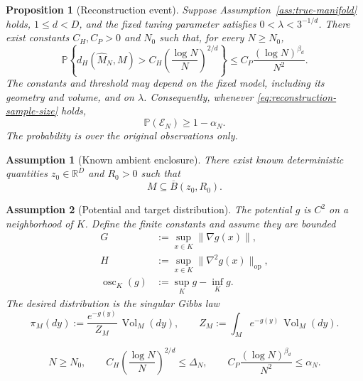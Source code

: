 \documentclass[10pt,a4paper]{amsart}
\newtheorem{assumption}{Assumption}
\newtheorem{proposition}{Proposition}
\newcommand{\Pp}{\mathbb P}
\newcommand{\R}{\mathbb R}
\newcommand{\Vol}{\operatorname{Vol}}
\newcommand{\cE}{\mathcal E}
\newcommand{\osc}{\operatorname{osc}}
\newcommand{\wideM}{\widehat M_N}
\begin{document}
\begin{proposition}[Reconstruction event]
\label{prop:reconstruction-event}
Suppose Assumption~\ref{ass:true-manifold} holds, $1\le d<D$, and the
fixed tuning parameter satisfies $0<\lambda<3^{-1/d}$. There exist
constants $C_H,C_P>0$ and $N_0$ such that, for every $N\ge N_0$,
\begin{equation}
 \Pp\left\{
 d_H(\wideM,M)>
 C_H\left(\frac{\log N}{N}\right)^{2/d}
 \right\}
 \le C_P\frac{(\log N)^{\beta_d}}{N^2}.
\label{eq:divol-reconstruction-tail}
\end{equation}
The constants and threshold may depend on the fixed model, including its
geometry and volume, and on $\lambda$. Consequently, whenever
\eqref{eq:reconstruction-sample-size} holds,
\begin{equation}
  \Pp(\cE_N)\ge1-\alpha_N.
\label{eq:event-probability}
\end{equation}
The probability is over the original observations only.
\end{proposition}

\begin{assumption}[Known ambient enclosure]
\label{ass:ambient-envelope}
There exist known deterministic quantities $z_0\in\R^D$ and $R_0>0$
such that
\[
    M\subseteq \overline B(z_0,R_0).
\]
\end{assumption}

\begin{assumption}[Potential and target distribution]
\label{ass:potential-target}
The potential $g$ is $C^2$ on a neighborhood of $K$. Define the finite
constants and assume they are bounded
\begin{align}
 G&:=\sup_{x\in K}\lVert\nabla g(x)\rVert,\label{eq:G-def}\\
 H&:=\sup_{x\in K}\lVert\nabla^2g(x)\rVert_{\mathrm{op}},\label{eq:H-def}\\
 \osc_K(g)&:=\sup_Kg-\inf_Kg.\label{eq:osc-def}
\end{align}
The desired distribution is the singular Gibbs law
\begin{equation}
  \pi_M(dy)
  :=\frac{e^{-g(y)}}{Z_M}\,\Vol_M(dy),
  \qquad
  Z_M:=\int_Me^{-g(y)}\,\Vol_M(dy).
\label{eq:true-target}
\end{equation}
\end{assumption}

\begin{equation}
 N\ge N_0,
 \qquad
 C_H\left(\frac{\log N}{N}\right)^{2/d}\le\Delta_N,
 \qquad
 C_P\frac{(\log N)^{\beta_d}}{N^2}\le\alpha_N.
\label{eq:reconstruction-sample-size}
\end{equation}
\end{document}

